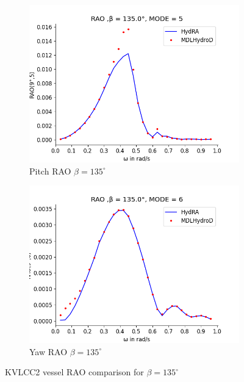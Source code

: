 \begin{figure}[H]
\begin{subfigure}[b]{0.49\textwidth}
        \includegraphics[width=\textwidth]{plots/kvlcc/rao2/rao5.png}
        \caption{Pitch RAO $\beta = 135^{\circ}$}
    \end{subfigure}
    \begin{subfigure}[b]{0.49\textwidth}
        \includegraphics[width=\textwidth]{plots/kvlcc/rao2/rao6.png}
        \caption{Yaw RAO $\beta = 135^{\circ}$}
    \end{subfigure}
    \caption{KVLCC2 vessel RAO comparison for $\beta= 135^{\circ}$}
    \label{fig:kvlcc_rao_135}
\end{figure}

\newpage
